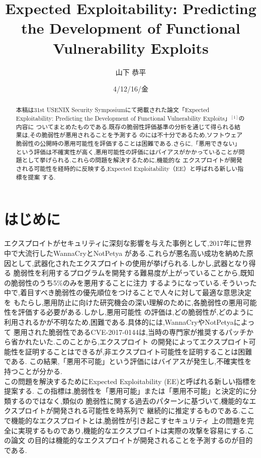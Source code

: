 \documentclass[submit,techreq,noauthor]{eco}	%
\begin{document}
\date   {4/12/16/金}				%
\title  {Expected Exploitability: Predicting the Development of Functional Vulnerability Exploits}	%
\author {山下 恭平}				%

\begin{abstract}
本稿は31st USENIX Security Symposiumにて掲載された論文「Expected Exploitability: Predicting 
the Development of Functional Vulnerability Exploits」\begin{math}^{[1]}\end{math}の内容に
ついてまとめたものである.既存の脆弱性評価基準の分析を通じて得られる結果は,その脆弱性が悪用されることを予測する
のには不十分であるため,ソフトウェア脆弱性の公開時の悪用可能性を評価することは困難である.さらに,「悪用できない」
という評価は不確実性が高く,悪用可能性の評価にはバイアスがかかっていることが問題として挙げられる.これらの問題を解決するために,機能的な
エクスプロイトが開発される可能性を経時的に反映する,Expected Exploitability（EE）と呼ばれる新しい指標を提案
する.

\end{abstract}
\maketitle

\section{はじめに}
エクスプロイトがセキュリティに深刻な影響を与えた事例として,2017年に世界中で大流行したWannaCryとNotPetya
がある.これらが悪名高い成功を納めた原因として,武器化されたエクスプロイトの使用が挙げられる.しかし,武器となり得る
脆弱性を利用するプログラムを開発する難易度が上がっていることから,既知の脆弱性のうち5\%のみを悪用することに注力
するようになっている.そういった中で,着目すべき脆弱性の優先順位をつけることで人々に対して最適な意思決定を
もたらし,悪用防止に向けた研究機会の深い理解のために,各脆弱性の悪用可能性を評価する必要がある.しかし,悪用可能性
の評価は,どの脆弱性が,どのように利用されるかが不明なため,困難である.具体的には,WannaCryやNotPetyaによって
悪用された脆弱性であるCVE-2017-0144は,当時の専門家が推奨するパッチから省かれたいた.このことから,エクスプロイト
の開発によってエクスプロイト可能性を証明することはできるが,非エクスプロイト可能性を証明することは困難である.
この結果,「悪用不可能」という評価にはバイアスが発生し,不確実性を持つことが分かる.\\
この問題を解決するためにExpected Exploitability (EE)と呼ばれる新しい指標を提案する.
この指標は,脆弱性を「悪用可能」または「悪用不可能」と決定的に分類するのではなく,類似の
脆弱性に関する過去のパターンに基づいて,機能的なエクスプロイトが開発される可能性を時系列で
継続的に推定するものである.ここで機能的なエクスプロイトとは,脆弱性が引き起こすセキュリティ
上の問題を完全に実現するものであり,機能的なエクスプロイトは実際の攻撃を容易にする.この論文
の目的は機能的なエクスプロイトが開発されることを予測するのが目的である.
\end{document}
